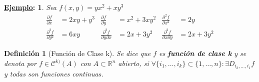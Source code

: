 \documentclass[10pt,a4paper,openright]{book}
\theoremstyle{break}
\newtheorem*{defi}{Definición}
\newtheorem*{ej}{\underline{Ejemplo}:}
\begin{document}
\begin{ej}
Sea $f(x,y)= yx^2 + xy^3$
\begin{align*}
\frac{\partial f}{\partial x} & = 2xy + y^3 & \frac{\partial f}{\partial y} & = x^2 + 3xy^2 & \frac{\partial^2 f}{\partial x^2} & = 2y \\ \frac{\partial^2 f}{\partial y^2} & = 6xy & \frac{\partial^2 f}{\partial y \partial x} & = 2x + 3y^2 & \frac{\partial^2 f}{ \partial x\partial y} & = 2x + 3y^2
\end{align*}
\end{ej}

\begin{defi}[Función de Clase k]
Se dice que $f$ es \textbf{función de clase k} y se denota por $f \in \mathcal{C}^{k)} (A)$ con $A \subset \mathbb{R}^n$ abierto, si $\forall \{i_1, \ldots, i_k\} \subset \{1, \ldots, n\}: \exists D_{i_k, \ldots, i_1} f$ y todas son funciones continuas.
\end{defi}
\end{document}
